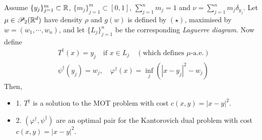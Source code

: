 \documentclass[12pt,a4paper]{article}
\renewenvironment{i}
{\begin{itemize} 
	}%
	{\end{itemize}
}
\begin{document}
 Assume $\{y_j \}_{j=1}^m \subset \mathbb{R}$, $\{m_j\}_{j=1}^m \subset [0,1]$, $\sum_{j=1}^n m_j =1$ and $\nu = \sum_{j=1}^n m_j \delta_{y_j}$. Let $\mu \in \mathscr{P}_2(\mathbb{R}^d)$ have density $\rho$ and $g(w)$ is defined by $(\star)$, maximised by $w= (w_1, \cdots, w_n)$, and let $\{L_j\}_{j=1}^n$ be the corresponding \emph{Laguerre diagram}. Now define
\begin{align*}
&T^{\dagger}(x) = y_j \quad \text{if } x\in L_j \quad (\text{which defines }\mu\text{-a.e.}) \\
&\psi^{\dagger}(y_j) = w_j, \quad \varphi^{\dagger}(x) = \inf_{j} (|x-y_j|^2 -w_j)
\end{align*}
Then,
\begin{i}
\item[1.] $T^{\dagger}$ is a solution to the MOT problem with cost $c(x,y) = |x-y|^2$.
\item[2.] $(\varphi^{\dagger}, \psi^{\dagger})$ are an optimal pair for the Kantorovich dual problem with cost $c(x,y) = |x-y|^2$.
\end{i}
\end{document}
